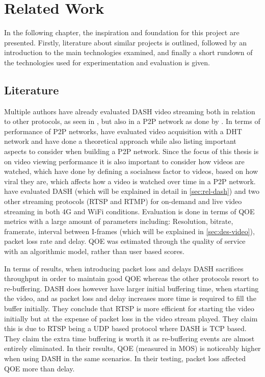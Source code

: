 \chapter{Related Work}
\label{cha:related-work}
In the following chapter, the inspiration and foundation for this project are presented. Firstly, literature about similar projects is outlined, followed by an introduction to the main technologies examined, and finally a short rundown of the technologies used for experimentation and evaluation is given. 

\section{Literature}
Multiple authors have already evaluated \ac{DASH} video streaming both in relation to other protocols, as seen in \citet{aloman2015performance}, but also in a \ac{P2P} network as done by \citet{gazdar2017toward}. In terms of performance of \ac{P2P} networks, \citet{nguyen2009p2p} have evaluated video acquisition with a \ac{DHT} network and \citet{qiu2004modeling} have done a theoretical approach while also listing important aspects to consider when building a \ac{P2P} network. Since the focus of this thesis is on video viewing performance it is also important to consider how videos are watched, which \citet{broxton2013catching} have done by defining a socialness factor to videos, based on how viral they are, which affects how a video is watched over time in a \ac{P2P} network.
\\


\citet{aloman2015performance} have evaluated \ac{DASH} (which will be explained in detail in \autoref{sec:rel-dash}) and two other streaming protocols (\ac{RTSP} and \ac{RTMP}) for on-demand and live video streaming in both 4G and WiFi conditions. Evaluation is done in terms of \ac{QOE} metrics with a large amount of parameters including: Resolution, bitrate, framerate, interval between \acsp{I-frame} (which will be explained in \autoref{sec:des-video}), packet loss rate and delay. \ac{QOE} was estimated through the quality of service with an algorithmic model, rather than user based scores.

In terms of results, when introducing packet loss and delays \ac{DASH} sacrifices throughput in order to maintain good \ac{QOE} whereas the other protocols resort to re-buffering. \ac{DASH} does however have larger initial buffering time, when starting the video, and as packet loss and delay increases more time is required to fill the buffer initially. They conclude that \ac{RTSP} is more efficient for starting the video initially but at the expense of packet loss in the video stream played. They claim this is due to \ac{RTSP} being a \ac{UDP} based protocol where \ac{DASH} is \ac{TCP} based.
They claim the extra time buffering is worth it as re-buffering events are almost entirely eliminated. In their results, \ac{QOE} (measured in \ac{MOS}) is noticeably higher when using \ac{DASH} in the same scenarios. In their testing, packet loss affected \ac{QOE} more than delay.
\\


